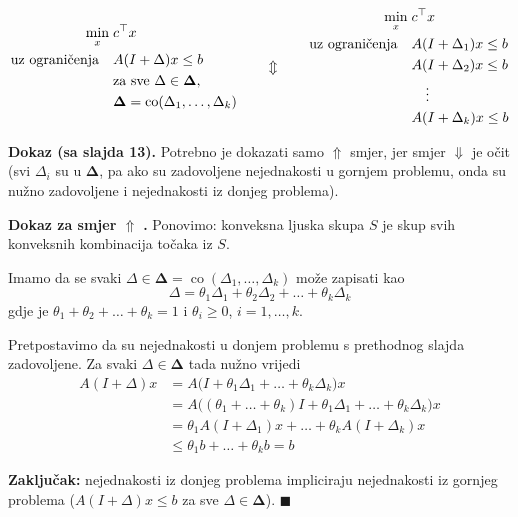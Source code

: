 \begin{teorem}
\[
\begin{aligned}
\min_x \; & c\T x \\
\uzogr & A(I+\Delta)x \le b \\
& \text{za sve } \Delta \in \boldsymbol\Delta, \\
& \boldsymbol\Delta = \operatorname{co}(\Delta_1,\dots,\Delta_k)
\end{aligned}
\qquad\Updownarrow\qquad
\begin{aligned}
\min_x \; & c\T x \\
\uzogr & A(I+\Delta_1)x \le b \\
& A(I+\Delta_2)x \le b \\
& \quad\vdots \\
& A(I+\Delta_k)x \le b
\end{aligned}
\]
\end{teorem}

\textbf{Dokaz (sa slajda 13).} Potrebno je dokazati samo $\Uparrow$ smjer, jer
smjer $\Downarrow$ je očit (svi $\Delta_i$ su u $\boldsymbol\Delta$, pa ako su
zadovoljene nejednakosti u gornjem problemu, onda su nužno zadovoljene i
nejednakosti iz donjeg problema).

\textbf{Dokaz za smjer $\Uparrow$} \textbf{.} Ponovimo: konveksna
ljuska skupa $S$ je skup svih konveksnih kombinacija točaka iz $S$.

Imamo da se svaki $\Delta \in \boldsymbol\Delta =
\operatorname{co}(\Delta_1,\dots,\Delta_k)$ može zapisati kao
\[
\Delta = \theta_1\Delta_1 + \theta_2\Delta_2 + \dots + \theta_k\Delta_k
\]
gdje je $\theta_1 + \theta_2 + \dots + \theta_k = 1$ i $\theta_i \ge 0$,
$i = 1,\dots,k$.

Pretpostavimo da su nejednakosti u donjem problemu s prethodnog slajda
zadovoljene. Za svaki $\Delta \in \boldsymbol\Delta$ tada nužno vrijedi
\begin{align}
A(I+\Delta)x
&= A\big(I + \theta_1\Delta_1 + \dots + \theta_k\Delta_k\big)x \\
&= A\big((\theta_1 + \dots + \theta_k)I
   + \theta_1\Delta_1 + \dots + \theta_k\Delta_k\big)x \\
&= \theta_1A(I+\Delta_1)x + \dots + \theta_kA(I+\Delta_k)x \\
&\le \theta_1b + \dots + \theta_kb = b
\end{align}

\textbf{Zaključak:} nejednakosti iz donjeg problema impliciraju nejednakosti iz
gornjeg problema ($A(I+\Delta)x \le b$ za sve $\Delta \in \boldsymbol\Delta$).
$\blacksquare$

